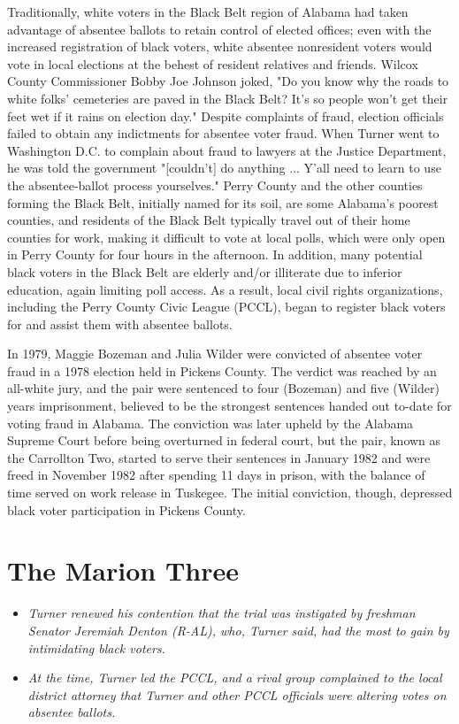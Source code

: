 Traditionally, white voters in the Black Belt region of Alabama had
taken advantage of absentee ballots to retain control of elected
offices; even with the increased registration of black voters, white
absentee nonresident voters would vote in local elections at the behest
of resident relatives and friends. Wilcox County Commissioner Bobby Joe
Johnson joked, "Do you know why the roads to white folks' cemeteries are
paved in the Black Belt? It's so people won't get their feet wet if it
rains on election day." Despite complaints of fraud, election officials
failed to obtain any indictments for absentee voter fraud. When Turner
went to Washington D.C. to complain about fraud to lawyers at the
Justice Department, he was told the government "{[}couldn't{]} do
anything ... Y'all need to learn to use the absentee-ballot process
yourselves." Perry County and the other counties forming the Black Belt,
initially named for its soil, are some Alabama's poorest counties, and
residents of the Black Belt typically travel out of their home counties
for work, making it difficult to vote at local polls, which were only
open in Perry County for four hours in the afternoon. In addition, many
potential black voters in the Black Belt are elderly and/or illiterate
due to inferior education, again limiting poll access. As a result,
local civil rights organizations, including the Perry County Civic
League (PCCL), began to register black voters for and assist them with
absentee ballots.

In 1979, Maggie Bozeman and Julia Wilder were convicted of absentee
voter fraud in a 1978 election held in Pickens County. The verdict was
reached by an all-white jury, and the pair were sentenced to four
(Bozeman) and five (Wilder) years imprisonment, believed to be the
strongest sentences handed out to-date for voting fraud in Alabama. The
conviction was later upheld by the Alabama Supreme Court before being
overturned in federal court, but the pair, known as the Carrollton Two,
started to serve their sentences in January 1982 and were freed in
November 1982 after spending 11 days in prison, with the balance of time
served on work release in Tuskegee. The initial conviction, though,
depressed black voter participation in Pickens County.

\section{The Marion Three}\label{the-marion-three}

\begin{itemize}
\item
  \emph{Turner renewed his contention that the trial was instigated by
  freshman Senator Jeremiah Denton (R-AL), who, Turner said, had the
  most to gain by intimidating black voters.}
\item
  \emph{At the time, Turner led the PCCL, and a rival group complained
  to the local district attorney that Turner and other PCCL officials
  were altering votes on absentee ballots.}
\end{itemize}

